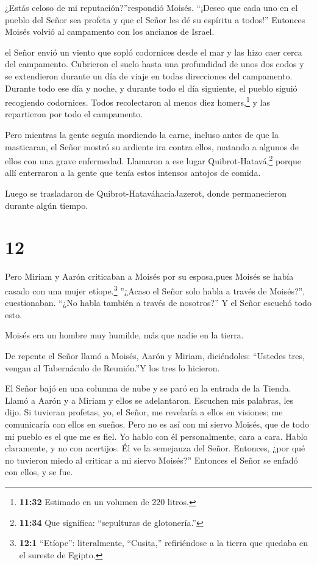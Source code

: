 ¿Estás celoso de mi reputación?''respondió Moisés.
``¡Deseo que cada uno en el pueblo del Señor sea profeta y que el Señor
les dé su espíritu a todos!''  Entonces Moisés volvió al
campamento con los ancianos de Israel.

 el Señor envió un viento que sopló codornices desde el mar
y las hizo caer cerca del campamento. Cubrieron el suelo hasta una
profundidad de unos dos codos y se extendieron durante un día de viaje
en todas direcciones del campamento.  Durante todo ese día
y noche, y durante todo el día siguiente, el pueblo siguió recogiendo
codornices. Todos recolectaron al menos diez homers,\footnote{\textbf{11:32}
  Estimado en un volumen de 220 litros.} y las repartieron por todo el
campamento.

 Pero mientras la gente seguía mordiendo la carne, incluso
antes de que la masticaran, el Señor mostró su ardiente ira contra
ellos, matando a algunos de ellos con una grave enfermedad.
 Llamaron a ese lugar Quibrot-Hatavá,\footnote{\textbf{11:34}
  Que significa: ``sepulturas de glotonería.''} porque allí enterraron a
la gente que tenía estos intensos antojos de comida.

 Luego se trasladaron de Quibrot-HataváhaciaJazerot, donde
permanecieron durante algún tiempo.

\hypertarget{section-11}{%
\section{12}\label{section-11}}

 Pero Miriam y Aarón criticaban a Moisés por su esposa,pues
Moisés se había casado con una mujer etíope.\footnote{\textbf{12:1}
  ``Etíope'': literalmente, ``Cusita,'' refiriéndose a la tierra que
  quedaba en el sureste de Egipto.}  ''¿Acaso el Señor solo
habla a través de Moisés?'', cuestionaban. ``¿No habla también a través
de nosotros?'' Y el Señor escuchó todo esto.

 Moisés era un hombre muy humilde, más que nadie en la
tierra.

 De repente el Señor llamó a Moisés, Aarón y Miriam,
diciéndoles: ``Ustedes tres, vengan al Tabernáculo de Reunión.''Y los
tres lo hicieron.

 El Señor bajó en una columna de nube y se paró en la
entrada de la Tienda. Llamó a Aarón y a Miriam y ellos se adelantaron.
 Escuchen mis palabras, les dijo. Si tuvieran profetas, yo,
el Señor, me revelaría a ellos en visiones; me comunicaría con ellos en
sueños.  Pero no es así con mi siervo Moisés, que de todo mi
pueblo es el que me es fiel.  Yo hablo con él personalmente,
cara a cara. Hablo claramente, y no con acertijos. Él ve la semejanza
del Señor. Entonces, ¿por qué no tuvieron miedo al criticar a mi siervo
Moisés?''  Entonces el Señor se enfadó con ellos, y se fue.

